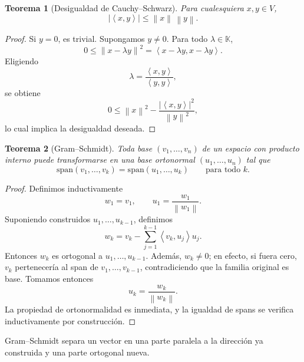 \documentclass[10pt,a4paper,oneside]{article}
\theoremstyle{plain}
\newtheorem{theorem}{Teorema}[section]
\theoremstyle{definition}
\theoremstyle{remark}
\newcommand{\K}{\mathbb{K}}
\newcommand{\Span}{\mathrm{span}}
\newcommand{\angles}[1]{\left\langle #1 \right\rangle}
\newcommand{\norm}[1]{\left\lVert #1 \right\rVert}
\newcommand{\abs}[1]{\left\lvert #1 \right\rvert}
\begin{document}
\begin{theorem}[Desigualdad de Cauchy--Schwarz]
Para cualesquiera \(x,y\in V\),
\[
\abs{\angles{x,y}}\le \norm{x}\,\norm{y}.
\]
\end{theorem}

\begin{proof}
Si \(y=0\), es trivial. Supongamos \(y\neq 0\). Para todo \(\lambda\in\K\),
\[
0\le \norm{x-\lambda y}^2
=\angles{x-\lambda y,x-\lambda y}.
\]
Eligiendo
\[
\lambda=\frac{\angles{x,y}}{\angles{y,y}},
\]
se obtiene
\[
0\le \norm{x}^2-\frac{\abs{\angles{x,y}}^2}{\norm{y}^2},
\]
lo cual implica la desigualdad deseada. \end{proof}

\begin{theorem}[Gram--Schmidt]
Toda base \((v_1,\dots,v_n)\) de un espacio con producto interno puede transformarse en una base ortonormal \((u_1,\dots,u_n)\) tal que
\[
\Span(v_1,\dots,v_k)=\Span(u_1,\dots,u_k)
\qquad
\text{para todo }k.
\]
\end{theorem}

\begin{proof}
Definimos inductivamente
\[
w_1=v_1,
\qquad
u_1=\frac{w_1}{\norm{w_1}}.
\]
Suponiendo construidos \(u_1,\dots,u_{k-1}\), definimos
\[
w_k=v_k-\sum_{j=1}^{k-1}\angles{v_k,u_j}u_j.
\]
Entonces \(w_k\) es ortogonal a \(u_1,\dots,u_{k-1}\). Además, \(w_k\neq 0\); en efecto, si fuera cero, \(v_k\) pertenecería al span de \(v_1,\dots,v_{k-1}\), contradiciendo que la familia original es base. Tomamos entonces
\[
u_k=\frac{w_k}{\norm{w_k}}.
\]
La propiedad de ortonormalidad es inmediata, y la igualdad de spans se verifica inductivamente por construcción. \end{proof}

\begin{center}

{\small Gram--Schmidt separa un vector en una parte paralela a la dirección ya construida y una parte ortogonal nueva.}
\end{center}
\end{document}
